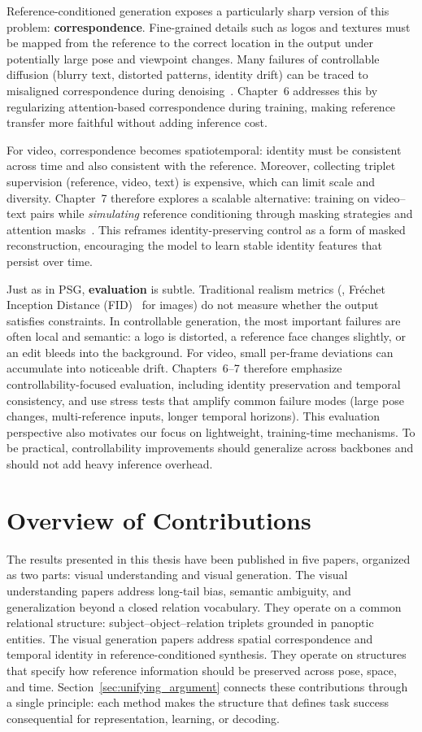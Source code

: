 Reference-conditioned generation exposes a particularly sharp version of this problem: \textbf{correspondence}. Fine-grained details such as logos and textures must be mapped from the reference to the correct location in the output under potentially large pose and viewpoint changes. Many failures of controllable diffusion (blurry text, distorted patterns, identity drift) can be traced to misaligned correspondence during denoising~\citep{chefer2023attend, cao2023masactrl, zhou2025learning}. Chapter~6 addresses this by regularizing attention-based correspondence during training, making reference transfer more faithful without adding inference cost.

For video, correspondence becomes spatiotemporal: identity must be consistent across time and also consistent with the reference. Moreover, collecting triplet supervision (reference, video, text) is expensive, which can limit scale and diversity. Chapter~7 therefore explores a scalable alternative: training on video--text pairs while \emph{simulating} reference conditioning through masking strategies and attention masks~\citep{zhou2025scaling}. This reframes identity-preserving control as a form of masked reconstruction, encouraging the model to learn stable identity features that persist over time.

Just as in PSG, \textbf{evaluation} is subtle. Traditional realism metrics (\eg, Fr\'echet Inception Distance (FID)~\citep{heusel2017gans} for images) do not measure whether the output satisfies constraints. In controllable generation, the most important failures are often local and semantic: a logo is distorted, a reference face changes slightly, or an edit bleeds into the background. For video, small per-frame deviations can accumulate into noticeable drift. Chapters~6--7 therefore emphasize controllability-focused evaluation, including identity preservation and temporal consistency, and use stress tests that amplify common failure modes (large pose changes, multi-reference inputs, longer temporal horizons). This evaluation perspective also motivates our focus on lightweight, training-time mechanisms. To be practical, controllability improvements should generalize across backbones and should not add heavy inference overhead.

\section{Overview of Contributions}
The results presented in this thesis have been published in five papers, organized as two parts: visual understanding and visual generation.
The visual understanding papers address long-tail bias, semantic ambiguity, and generalization beyond a closed relation vocabulary. They operate on a common relational structure: subject--object--relation triplets grounded in panoptic entities. The visual generation papers address spatial correspondence and temporal identity in reference-conditioned synthesis. They operate on structures that specify how reference information should be preserved across pose, space, and time. Section~\ref{sec:unifying_argument} connects these contributions through a single principle: each method makes the structure that defines task success consequential for representation, learning, or decoding.

